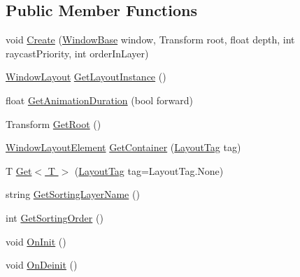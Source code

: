 \subsection*{Public Member Functions}
\begin{DoxyCompactItemize}
\item 
void \hyperlink{class_unity_engine_1_1_u_i_1_1_windows_1_1_types_1_1_layout_a13ecdbd61891445dfd943c730fcc284a}{Create} (\hyperlink{class_unity_engine_1_1_u_i_1_1_windows_1_1_window_base}{Window\+Base} window, Transform root, float depth, int raycast\+Priority, int order\+In\+Layer)
\item 
\hyperlink{class_unity_engine_1_1_u_i_1_1_windows_1_1_window_layout}{Window\+Layout} \hyperlink{class_unity_engine_1_1_u_i_1_1_windows_1_1_types_1_1_layout_a51aebe2c7e188555a47a1636ea09238d}{Get\+Layout\+Instance} ()
\item 
float \hyperlink{class_unity_engine_1_1_u_i_1_1_windows_1_1_types_1_1_layout_a31fda2c34edfea9ec3ca99476eaf16a0}{Get\+Animation\+Duration} (bool forward)
\item 
Transform \hyperlink{class_unity_engine_1_1_u_i_1_1_windows_1_1_types_1_1_layout_ae50de131f2e68c2e82161bb8ef5a80eb}{Get\+Root} ()
\item 
\hyperlink{class_unity_engine_1_1_u_i_1_1_windows_1_1_window_layout_element}{Window\+Layout\+Element} \hyperlink{class_unity_engine_1_1_u_i_1_1_windows_1_1_types_1_1_layout_aa8924ec902fdacea98bccc5f921474c6}{Get\+Container} (\hyperlink{namespace_unity_engine_1_1_u_i_1_1_windows_a954ff5db0de6295464f3b95598158333}{Layout\+Tag} tag)
\item 
T \hyperlink{class_unity_engine_1_1_u_i_1_1_windows_1_1_types_1_1_layout_a8b8ab7ef40998779834b0f604ec6d539}{Get$<$ T $>$} (\hyperlink{namespace_unity_engine_1_1_u_i_1_1_windows_a954ff5db0de6295464f3b95598158333}{Layout\+Tag} tag=Layout\+Tag.\+None)
\item 
string \hyperlink{class_unity_engine_1_1_u_i_1_1_windows_1_1_types_1_1_layout_ad28a435b065be6649815f917ffc27af5}{Get\+Sorting\+Layer\+Name} ()
\item 
int \hyperlink{class_unity_engine_1_1_u_i_1_1_windows_1_1_types_1_1_layout_a0524433d5fc5dc45c5527c2d85693d7e}{Get\+Sorting\+Order} ()
\item 
void \hyperlink{class_unity_engine_1_1_u_i_1_1_windows_1_1_types_1_1_layout_a03cf124290d272a1796794c1ae36d970}{On\+Init} ()
\item 
void \hyperlink{class_unity_engine_1_1_u_i_1_1_windows_1_1_types_1_1_layout_acdbf5db02e0c3468381e3c82ddf1ef2c}{On\+Deinit} ()

\end{DoxyCompactItemize}

